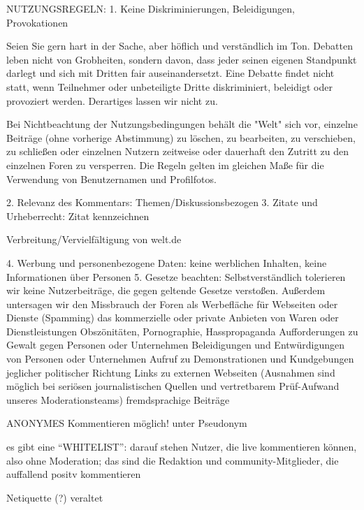 NUTZUNGSREGELN:
1. Keine Diskriminierungen, Beleidigungen, Provokationen

Seien Sie gern hart in der Sache, aber höflich und verständlich im Ton. Debatten leben nicht von Grobheiten, sondern davon, dass jeder seinen eigenen Standpunkt darlegt und sich mit Dritten fair auseinandersetzt. Eine Debatte findet nicht statt, wenn Teilnehmer oder unbeteiligte Dritte diskriminiert, beleidigt oder provoziert werden. Derartiges lassen wir nicht zu.

Bei Nichtbeachtung der Nutzungsbedingungen behält die "Welt" sich vor, einzelne Beiträge (ohne vorherige Abstimmung) zu löschen, zu bearbeiten, zu verschieben, zu schließen oder einzelnen Nutzern zeitweise oder dauerhaft den Zutritt zu den einzelnen Foren zu versperren. Die Regeln gelten im gleichen Maße für die Verwendung von Benutzernamen und Profilfotos.

2. Relevanz des Kommentars: Themen/Diskussionsbezogen
3. Zitate und Urheberrecht: Zitat kennzeichnen

Verbreitung/Vervielfältigung von welt.de 

4. Werbung und personenbezogene Daten: keine werblichen Inhalten, keine Informationen über Personen
5. Gesetze beachten: Selbstverständlich tolerieren wir keine Nutzerbeiträge, die gegen geltende Gesetze verstoßen.
Außerdem untersagen wir den Missbrauch der Foren als Werbefläche für Webseiten oder Dienste (Spamming)
 das kommerzielle oder private Anbieten von Waren oder Dienstleistungen
 Obszönitäten, Pornographie, Hasspropaganda
 Aufforderungen zu Gewalt gegen Personen oder Unternehmen
 Beleidigungen und Entwürdigungen von Personen oder Unternehmen
 Aufruf zu Demonstrationen und Kundgebungen jeglicher politischer Richtung
 Links zu externen Webseiten (Ausnahmen sind möglich bei seriösen journalistischen Quellen und vertretbarem Prüf-Aufwand unseres Moderationsteams)
 fremdsprachige Beiträge
 
 
 ANONYMES Kommentieren möglich! unter Pseudonym
 
 es gibt eine ``WHITELIST'': darauf stehen Nutzer, die live kommentieren können, also ohne Moderation; das sind die Redaktion und community-Mitglieder, die auffallend positv kommentieren
 
 
 Netiquette (?) veraltet
 
 
 
 
 
 
 
 
 
 
 
 
 
 